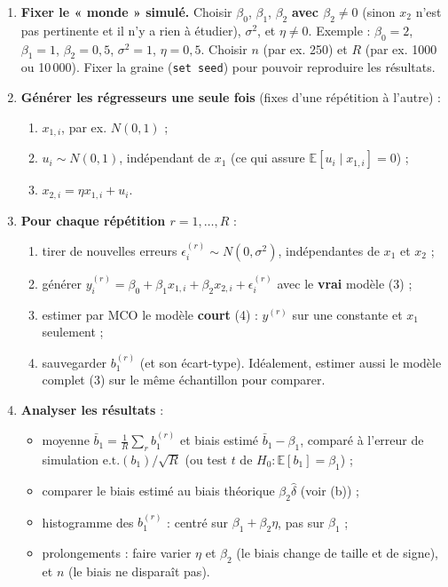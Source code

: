 \documentclass[11pt,a4paper]{article}
\newcommand{\E}{\mathbb{E}}\newcommand{\Var}{\operatorname{Var}}\newcommand{\Cov}{\operatorname{Cov}}
\begin{document}
\begin{enumerate}
\item \textbf{Fixer le « monde » simulé.} Choisir $\beta_0$, $\beta_1$, $\beta_2$ \textbf{avec $\beta_2\neq0$} (sinon $x_2$ n'est pas pertinente et il n'y a rien à étudier), $\sigma^2$, et $\eta\neq0$. Exemple : $\beta_0=2$, $\beta_1=1$, $\beta_2=0{,}5$, $\sigma^2=1$, $\eta=0{,}5$. Choisir $n$ (par ex. 250) et $R$ (par ex. 1000 ou 10\,000). Fixer la graine (\texttt{set seed}) pour pouvoir reproduire les résultats.
\item \textbf{Générer les régresseurs une seule fois} (fixes d'une répétition à l'autre) :
\begin{enumerate}[nosep]
\item $x_{1,i}$, par ex. $N(0,1)$ ;
\item $u_i\sim N(0,1)$, indépendant de $x_1$ (ce qui assure $\E[u_i\mid x_{1,i}]=0$) ;
\item $x_{2,i}=\eta x_{1,i}+u_i$.
\end{enumerate}
\item \textbf{Pour chaque répétition $r=1,\dots,R$} :
\begin{enumerate}[nosep]
\item tirer de nouvelles erreurs $\epsilon_i^{(r)}\sim N(0,\sigma^2)$, indépendantes de $x_1$ et $x_2$ ;
\item générer $y_i^{(r)}=\beta_0+\beta_1x_{1,i}+\beta_2x_{2,i}+\epsilon_i^{(r)}$ avec le \textbf{vrai} modèle (3) ;
\item estimer par MCO le modèle \textbf{court} (4) : $y^{(r)}$ sur une constante et $x_1$ seulement ;
\item sauvegarder $b_1^{(r)}$ (et son écart-type). Idéalement, estimer aussi le modèle complet (3) sur le même échantillon pour comparer.
\end{enumerate}
\item \textbf{Analyser les résultats} :
\begin{itemize}[nosep]
\item moyenne $\bar b_1=\frac1R\sum_rb_1^{(r)}$ et biais estimé $\bar b_1-\beta_1$, comparé à l'erreur de simulation $\text{e.t.}(b_1)/\sqrt R$ (ou test $t$ de $H_0:\E[b_1]=\beta_1$) ;
\item comparer le biais estimé au biais théorique $\beta_2\hat\delta$ (voir (b)) ;
\item histogramme des $b_1^{(r)}$ : centré sur $\beta_1+\beta_2\eta$, pas sur $\beta_1$ ;
\item prolongements : faire varier $\eta$ et $\beta_2$ (le biais change de taille et de signe), et $n$ (le biais ne disparaît pas).
\end{itemize}
\end{enumerate}
\end{document}
